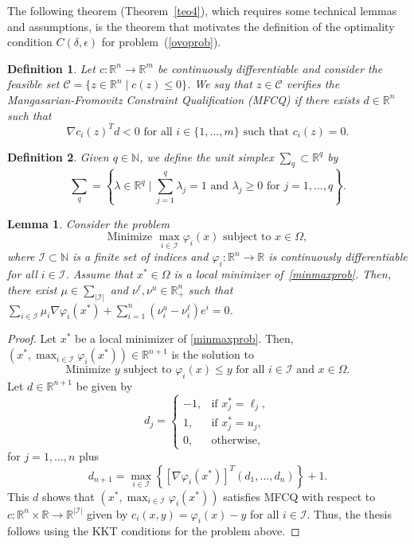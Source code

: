 \documentclass[11pt]{article}
\newcommand{\R}{\mathbb{R}}
\newcommand{\N}{\mathbb{N}}
\newcommand{\simplex}{\textstyle\sum}
\newtheorem{lemma}{Lemma}[section]
\newtheorem{definition}{Definition}[section]
\begin{document}
The following theorem (Theorem~\ref{teo4}), which requires some technical lemmas and assumptions, is the theorem that motivates the definition of the optimality condition $C(\delta,\epsilon)$ for problem~(\ref{ovoprob}).

\begin{definition}
Let $c : \R^n \to \R^m$ be continuously differentiable and consider the feasible set $\mathcal{C} = \{ z \in \R^n \; | \; c(z) \leq 0 \}$. We say that $z \in \mathcal{C}$ verifies the Mangasarian-Fromovitz Constraint Qualification (MFCQ) if there exists $d \in \R^n$ such that
\[
\nabla c_i(z)^Td < 0 \mbox{ for all } i \in \{ 1, \dots, m \} \mbox{ such that } c_i(z)=0.
\]
\end{definition}

\begin{definition}
Given $q \in \N$, we define the \textit{unit simplex} $\simplex_q \subset \R^q$ by 
\[
\simplex_q= \left\{ \lambda \in \R^q \;|\; \sum_{j=1}^q \lambda_j = 1 \mbox{ and } \lambda_j \geq 0 \mbox{ for } j=1,\dots,q \right\}.
\]
\end{definition}

\begin{lemma} \label{lem1}
Consider the problem
\begin{equation}\label{minmaxprob}
\mbox{Minimize } \max_{i \in \mathcal{I}} \varphi_i(x) \mbox{ subject to } x \in \Omega,
\end{equation}
where $\mathcal{I} \subset \N$ is a finite set of indices and $\varphi_i : \R^n \to \R$ is continuously differentiable for all $i \in \mathcal{I}$. Assume that $x^* \in \Omega$ is a local minimizer of~\eqref{minmaxprob}. Then, there exist $\mu \in \simplex_{|\mathcal{I}|}$ and $\nu^\ell, \nu^u \in \R^n_{+}$ such that $\sum_{i \in \mathcal{I}} \mu_i \nabla \varphi_i(x^*) + \sum_{i=1}^n ( \nu^u_i -\nu^\ell_i ) e^i = 0$.
\end{lemma}

\begin{proof}
Let $x^*$ be a local minimizer of \eqref{minmaxprob}. Then, $(x^*,\max_{i\in\mathcal{I}}\varphi_i(x^*)) \in \R^{n+1}$ is the solution to 
\[
\mbox{Minimize } y \mbox{ subject to } \varphi_i(x) \leq y \mbox{ for all } i \in \mathcal{I} \mbox{ and } x \in \Omega.
\]
Let $d \in \R^{n+1}$ be given by
\[
d_j =
\left\{
\begin{array}{rl}
-1, & \mbox{if } x^*_j = \ell_j,\\
 1, & \mbox{if } x^*_j = u_j,\\
 0, & \mbox{otherwise},
\end{array}
\right.
\]
for $j=1,\dots,n$ plus
\[
d_{n+1} = \max_{i \in \mathcal{I}} \left\{ \left[ \nabla \varphi_i(x^*) \right]^T (d_1,\dots,d_n) \right\} + 1.
\]
This $d$ shows that $(x^*,\max_{i\in\mathcal{I}}\varphi_i(x^*))$ satisfies MFCQ with respect to $c:\R^n \times \R \to \R^{|\mathcal{I}|}$ given by $c_i(x,y) = \varphi_i(x)-y$ for all $i \in \mathcal{I}$. Thus, the thesis follows using the KKT conditions for the problem above.
\end{proof}
\end{document}
